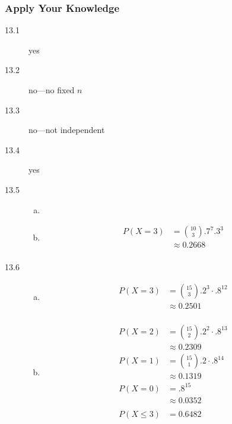 \documentclass[landscape]{exam}
\begin{document}
  \subsubsection{Apply Your Knowledge}
  \begin{description}
    \item[13.1] yes
    \item[13.2] no---no fixed $n$
    \item[13.3] no---not independent
    \item[13.4] yes

    \item[13.5]
      \begin{enumerate}[(a)]
        \item 

        \item 
          \begin{align*}
            P(X = 3) & = \binom{10}{3} .7^7 .3^3 \\
                     & \approx \boxed{ 0.2668 } \\
          \end{align*}

      \end{enumerate}
      
    \item[13.6] 
      \begin{enumerate}[(a)]
        \item 
          \begin{align*}
            P(X = 3) & = \binom{15}{3} .2^3 \cdot .8^{12} \\
                     & \approx \boxed{ 0.2501 } \\
          \end{align*}
          
        \item 
          \begin{align*}
            P(X = 2) & = \binom{15}{2} .2^2 \cdot .8^{13} \\
                     & \approx 0.2309 \\
            P(X = 1) & = \binom{15}{1} .2 \cdot .8^{14} \\
                     & \approx 0.1319 \\
            P(X = 0) & = .8^{15} \\
                     & \approx 0.0352 \\
                     \\
            P(X \leq 3) &= \boxed{ 0.6482 } \\
          \end{align*}


\end{enumerate}
\end{description}
\end{document}
